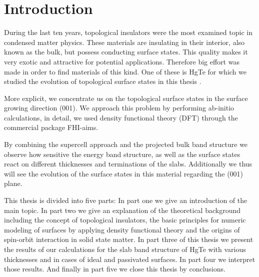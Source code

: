 \documentclass[english, a4, 12pt]{scrartcl}
\begin{document}
\section{Introduction}
	During the last ten years, topological insulators were the most examined topic in condensed matter physics. These materials are insulating in their interior, also known as the bulk, but possess conducting surface states. This quality makes it very exotic and attractive for potential applications. Therefore big effort was made in order to find materials of this kind. One of these is HgTe for which we studied the evolution of topological surface states in this thesis \cite{top_surf_states}. 
	
	More explicit, we concentrate us on the topological surface states in the surface growing direction (001). We approach this problem by performing ab-initio calculations, in detail, we used density functional theory (DFT) through the commercial package FHI-aims. 
	
	By combining the supercell approach and the projected bulk band structure we observe how sensitive the energy band structure, as well as the surface states react on different thicknesses and terminations of the slabs. 
	Additionally we thus will see the evolution of the surface states in this material regarding the (001) plane. 
	
	This thesis is divided into five parts: In part one we give an introduction of the main topic. In part two we give an explanation of the theoretical background including the concept of topological insulators, the basic principles for numeric modeling of surfaces by applying density functional theory and the origins of spin-orbit interaction in solid state matter.
	In part three of this thesis we present the results of our calculations for the slab band structure of HgTe with various thicknesses and in cases of ideal and passivated surfaces.
	In part four we interpret those results. And finally in part five we close this thesis by conclusions. 
		
\end{document}
